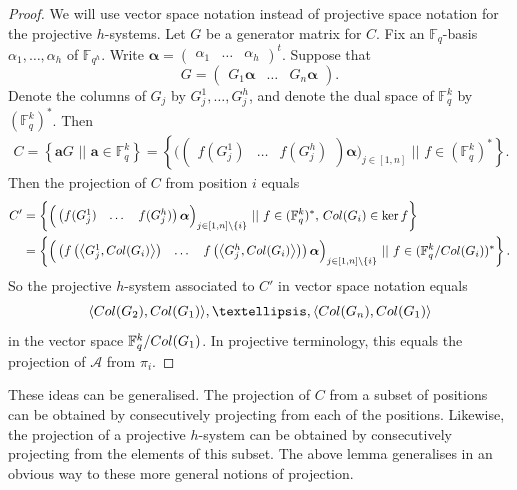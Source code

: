 \documentclass[a4paper]{article}
\theoremstyle{definition}
\newcommand{\FF}{\mathbb F}
\newcommand{\vspan}[1]{\left \langle #1 \right \rangle}
\newcommand{\set}[1]{ \left \{ #1 \right \} }
\newcommand{\sett}[2]{ \left\{ #1 \, \, || \, \, #2 \right \} }
\newcommand{\ma}{\mathcal A}
\newcommand{\col}{\textnormal{Col}}
\begin{document}
\begin{proof}
We will use vector space notation instead of projective space notation for the projective $h$-systems.
Let $G$ be a generator matrix for $C$.
Fix an $\FF_q$-basis $\alpha_1, \dots, \alpha_h$ of $\FF_{q^h}$.
Write 
\(\boldsymbol{\alpha} = \begin{pmatrix} \alpha_1 & \dots & \alpha_h \end{pmatrix}^t \).
Suppose that
\[
 G = \begin{pmatrix}
  G_1 \boldsymbol \alpha & \dots & G_n \boldsymbol \alpha
 \end{pmatrix}.
\]
Denote the columns of $G_j$ by $G_j^1, \dots, G_j^h$, and denote the dual space of $\FF_q^k$ by $(\FF_q^k)^*$.
Then
\begin{align*}
 C = \sett{ \mathbf a G}{ \mathbf a \in \FF_q^k}
 = \sett{\Big( \begin{pmatrix} f(G_j^1) & \dots & f(G_j^h) \end{pmatrix} \boldsymbol \alpha \Big)_{j \in [1,n] }}{ f \in (\FF_q^k)^*}.
\end{align*}
Then the projection of $C$ from position $i$ equals
\begin{align*}
 C' & = \sett{\Big(\begin{pmatrix} f(G_j^1) & \dots & f(G_j^h) \end{pmatrix} \boldsymbol \alpha \Big)_{j \in [1, n] \setminus \set i}}{ f \in (\FF_q^k)^*, \, \col(G_i) \in \ker f} \\
 & = \sett{\Big(\begin{pmatrix} f \left(\vspan{G_j^1,\col(G_i)}\right)  & \dots & f \left(\vspan{G_j^h,\col(G_i)}\right)\end{pmatrix} \boldsymbol \alpha \Big)_{j \in [1,n] \setminus \set i}}{ f \in (\FF_q^k / \col(G_i))^*}.
\end{align*}
So the projective $h$-system associated to $C'$ in vector space notation equals 
\[ \langle \col(G_2),\col(G_1) \rangle, \dots,  \langle \col(G_n),\col(G_1) \rangle \]
in the vector space $\FF_q^k / \col(G_1)$.
In projective terminology, this equals the projection of $\ma$ from $\pi_i$.
\end{proof}

These ideas can be generalised.
The projection of $C$ from a subset of positions can be obtained by consecutively projecting from each of the positions.
Likewise, the projection of a projective $h$-system can be obtained by consecutively projecting from the elements of this subset.
The above lemma generalises in an obvious way to these more general notions of projection.
\end{document}
